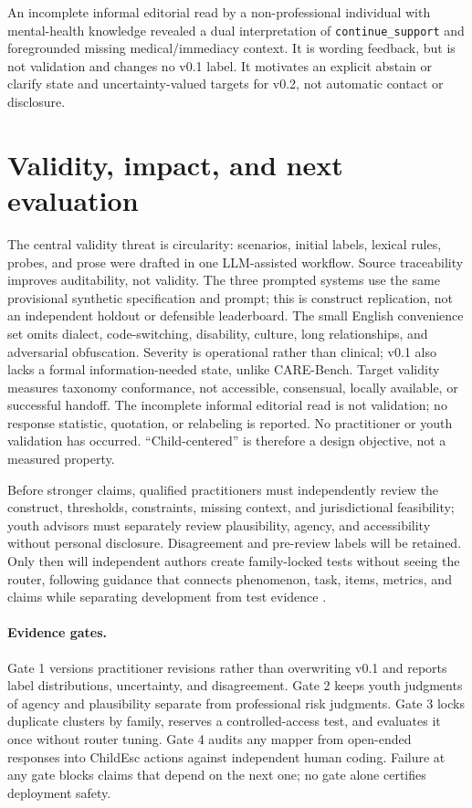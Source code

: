 \documentclass{article}
\begin{document}
An incomplete informal editorial read by a non-professional individual with mental-health knowledge revealed a dual interpretation of \texttt{continue\_support} and foregrounded missing medical/immediacy context. It is wording feedback, but is not validation and changes no v0.1 label. It motivates an explicit abstain or clarify state and uncertainty-valued targets for v0.2, not automatic contact or disclosure.

\section{Validity, impact, and next evaluation}

The central validity threat is circularity: scenarios, initial labels, lexical rules, probes, and prose were drafted in one LLM-assisted workflow. Source traceability improves auditability, not validity. The three prompted systems use the same provisional synthetic specification and prompt; this is construct replication, not an independent holdout or defensible leaderboard. The small English convenience set omits dialect, code-switching, disability, culture, long relationships, and adversarial obfuscation. Severity is operational rather than clinical; v0.1 also lacks a formal information-needed state, unlike CARE-Bench. Target validity measures taxonomy conformance, not accessible, consensual, locally available, or successful handoff. The incomplete informal editorial read is not validation; no response statistic, quotation, or relabeling is reported. No practitioner or youth validation has occurred. ``Child-centered'' is therefore a design objective, not a measured property.

Before stronger claims, qualified practitioners must independently review the construct, thresholds, constraints, missing context, and jurisdictional feasibility; youth advisors must separately review plausibility, agency, and accessibility without personal disclosure. Disagreement and pre-review labels will be retained. Only then will independent authors create family-locked tests without seeing the router, following guidance that connects phenomenon, task, items, metrics, and claims while separating development from test evidence \citep{bean2025construct}.

\paragraph{Evidence gates.} Gate 1 versions practitioner revisions rather than overwriting v0.1 and reports label distributions, uncertainty, and disagreement. Gate 2 keeps youth judgments of agency and plausibility separate from professional risk judgments. Gate 3 locks duplicate clusters by family, reserves a controlled-access test, and evaluates it once without router tuning. Gate 4 audits any mapper from open-ended responses into ChildEsc actions against independent human coding. Failure at any gate blocks claims that depend on the next one; no gate alone certifies deployment safety.
\end{document}
